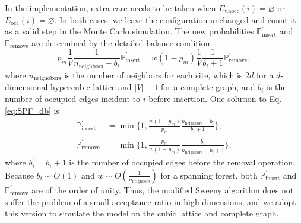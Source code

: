 In the implementation, extra care needs to be taken when $E_{\text{unocc}}(i) = \varnothing$ or $E_{\text{occ}}(i) = \varnothing$.
In both cases, we leave the configuration unchanged and count it as a valid step in the Monte Carlo simulation.
The new probabilities $\mathbb{P}^\prime_{\text{insert}}$ and $\mathbb{P}^\prime_{\text{remove}}$ are determined by the 
detailed balance condition
\begin{equation}\label{eq:SPF_db}
  p_m \frac{1}{V} \frac{1}{n_{\text{neighbors}}  - b_i} \mathbb{P}^\prime_{\text{insert}} =
  w (1-p_m) \frac{1}{V} \frac{1}{b_i+1} \mathbb{P}^\prime_{\text{remove}},
\end{equation}
where $n_{\text{neighobors}}$ is the number of neighbors for each site, which is $2d$ for a $d$-dimensional hypercubic
lattice and $|V|-1$ for a complete graph, and $b_i$ is the number of occupied edges incident to $i$ before insertion. 
One solution to Eq.\eqref{eq:SPF_db} is
\begin{equation}
\begin{aligned}
\mathbb{P}^\prime_{\text{insert}}  &= \min\{1, \frac{w(1-p_m)}{p_m}\frac{n_{\text{neighbors}}-b_i}{b_i+1}\}, \\
\mathbb{P}^\prime_{\text{remove}}  &= \min\{1, \frac{p_m}{w(1-p_m)}\frac{b_i^{\prime}}{n_{\text{neighbors}}-b_i^{\prime}+1}\},
\end{aligned}
\end{equation}
where $b^\prime_i = b_i + 1$ is the number of occupied edges before the removal operation. Because $b_i \sim O(1)$ and $w\sim O(\frac{1}{n_{\text{neighbors}}})$
for a spanning forest, both $\mathbb{P}^\prime_{\text{insert}}$ and $\mathbb{P}^\prime_{\text{remove}}$ are of the order of unity.
Thus, the modified Sweeny algorithm does not suffer the problem of a small acceptance ratio in high dimensions, and we adopt this version
to simulate the model on the cubic lattice and complete graph.

